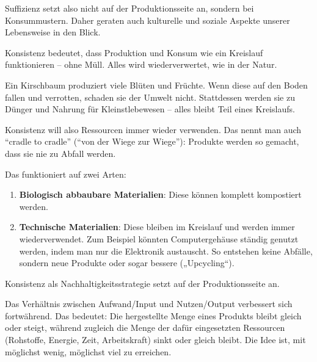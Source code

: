 \begin{myexercise}
\begin{textBox}[title = Suffizienz -- anders konsumieren für ein gutes Leben für alle \cite{suffizienz}]
        Suffizienz setzt also nicht auf der Produktionsseite an, sondern bei Konsummustern. Daher geraten auch kulturelle und soziale Aspekte unserer Lebensweise in den Blick.
    \end{textBox}

    \begin{textBox}[title = Konsistenz -- anders herstellen und
            nutzen \cite{konsistenz}]

        Konsistenz bedeutet, dass Produktion und Konsum wie ein Kreislauf funktionieren – ohne Müll. Alles wird wiederverwertet, wie in der Natur.

        Ein Kirschbaum produziert viele Blüten und Früchte. Wenn diese auf den Boden fallen und verrotten, schaden sie der Umwelt nicht. Stattdessen werden sie zu Dünger und Nahrung
        für Kleinstlebewesen – alles bleibt Teil eines Kreislaufs.

        Konsistenz will also Ressourcen immer wieder verwenden. Das nennt man auch \enquote{cradle to cradle} (\enquote{von der Wiege zur Wiege}): Produkte werden so gemacht, dass sie nie zu Abfall werden.

        Das funktioniert auf zwei Arten:

        \begin{enumerate}
            \item \textbf{Biologisch abbaubare Materialien}: Diese können komplett kompostiert werden.

            \item \textbf{Technische Materialien}: Diese bleiben im Kreislauf und werden immer wiederverwendet. Zum Beispiel könnten Computergehäuse ständig genutzt werden, indem man nur die Elektronik austauscht. So entstehen keine Abfälle, sondern neue Produkte oder sogar bessere („Upcycling“).
        \end{enumerate}
        Konsistenz als Nachhaltigkeitsstrategie setzt auf der Produktionsseite an.
    \end{textBox}

    \begin{textBox}[title = Effizienz -- besser produzieren mit weniger Ressourcenverbrauch und CO$_2$-Ausstoss \cite{effizienz}]


        Das Verhältnis zwischen Aufwand/Input und Nutzen/Output verbessert sich fortwährend. Das bedeutet: Die hergestellte Menge eines Produkts bleibt gleich oder steigt, während zugleich die Menge der dafür eingesetzten Ressourcen (Rohstoffe, Energie, Zeit, Arbeitskraft) sinkt oder gleich bleibt. Die Idee ist, mit möglichst wenig, möglichst viel zu erreichen.


\end{textBox}
\end{myexercise}
